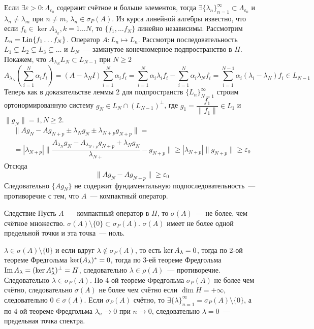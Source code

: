 \documentclass[14pt]{extarticle}
\begin{document}
\begin{Proof}
    Если $\exists \varepsilon > 0\colon \Lambda_{\varepsilon_0}$ содержит 
    счётное и больше элементов, тогда $\exists \{\lambda_n\}_{n = 1}^\infty
    \subset \Lambda_{\varepsilon_0}$ и $\lambda_n \ne \lambda_m$ при
    $n \ne m$, $\lambda_n \in \sigma_P(A)$.
    Из курса линейной алгебры известно, что если $f_k \in \ker A_{\lambda_k},
    k=1\dots N$, то $\{f_1,\dots f_N\}$ линейно независимы.
    Рассмотрим $L_n = \operatorname{Lin}\{f_1 \dots f_N\}$.
    Оператор $A : L_n \mapsto L_n$.
    Рассмотри последовательность $L_1 \varsubsetneq L_2 \varsubsetneq L_3
    \varsubsetneq \dots$ и $L_N$~--- замкнутое конечномерное подпространство
    в $H$.
    Покажем, что $A_{\lambda_N}L_N \subset L_{N - 1}$ при $N \ge 2$
    $$
    A_{\lambda_N} (\sum\limits_{i = 1}^N \alpha_i f_i) = (A - \lambda_N I)
    \sum\limits_{i = 1}^N \alpha_i f_i = \sum\limits_{i = 1}^N
    \alpha_i \lambda_i f_i - \sum\limits_{i = 1}^N \alpha_i \lambda_N f_i =
    \sum\limits_{i = 1}^{N - 1} \alpha_i (\lambda_i - \lambda_N) f_i \in 
    L_{N - 1}
    $$
    Теперь как в доказательстве леммы 2 для подпространств $\{L_n\}_{N = 1}^
    \infty$ строим ортонормированную систему $g_N \in L_N \cap (L_{N - 1})^
    \perp$, где $g_1 = \dfrac{f_1}{\|f_1\|} \in L_1$ и $\|g_N\| = 1, N \ge 2$.
    \begin{multline*}
    \|A g_N - A g_{N + p} \pm \lambda_N g_N \pm \lambda_{N + p} g_{N + p}\|
    =\\=
    |\lambda_{N + p}|\|\dfrac{A_{\lambda_N}g_N - A_{\lambda_{N + p}}g_{N + p} +
    \lambda_N g_N}{\lambda_{N +}} - g_{N + p}\| \ge |\lambda_{N + p}|\|g_{N+p}\| \ge \varepsilon_0
    \end{multline*}
    Отсюда
    $$
    \|A g_N - A g_{N + p}\| \ge \varepsilon_0
    $$
    Следовательно $\{A g_N\}$ не содержит фундаментальную 
    подпоследовательность~--- противоречие с тем, что $A$~--- компактный
    оператор.
\end{Proof}
\begin{MathCl}{Следствие}
    Пусть $A$~--- компактный оператор в $H$, то $\sigma(A)$~--- не более, 
    чем счётное множество.
    $\sigma(A) \setminus \{0\} \subset \sigma_P(A)$.
    $\sigma(A)$ имеет не более одной предельной точки и эта точка~--- ноль.
\end{MathCl}
\begin{Proof}
    $\lambda \in \sigma(A)\setminus\{0\}$ и если вдруг $\lambda \notin
    \sigma_P(A)$, то есть $\ker \Al = 0$, тогда по 2-ой теореме Фредгольма
    $\ker(\Al)^* = 0$, тогда по 3-ей теореме Фредгольма $\Im \Al = (\ker
    \Al^*)^\perp = H$, следовательно $\lambda \in \rho(A)$~--- противоречие.
    Следовательно $\lambda \in \sigma_P(A)$.
    По 4-ой теореме Фредгольма $\sigma_P(A)$ не более чем счётно,
    следовательно $\sigma(A)$ не более чем счётно если $\dim H = +\infty$,
    следовательно $0 \in \sigma(A)$.
    Если $\sigma_P(A)$ счётно, то $\exists \{\lambda\}_{n = 1}^\infty = 
    \sigma_P(A) \setminus\{0\}$, а по 4-ой теореме Фредгольма $\lambda_n \to 0
    $ при $n \to 0$, следовательно $\lambda = 0$~--- предельная точка спектра.
\end{Proof}
\end{document}
